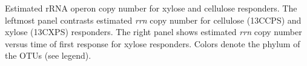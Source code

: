 Estimated rRNA operon copy number for xylose and cellulose responders. The
leftmost panel contrasts estimated \textit{rrn} copy number for cellulose (13CCPS) and 
xylose (13CXPS) responders. The right panel shows estimated \textit{rrn} copy number
versus time of first response for xylose responders. Colors denote the phylum
of the OTUs (see legend).

